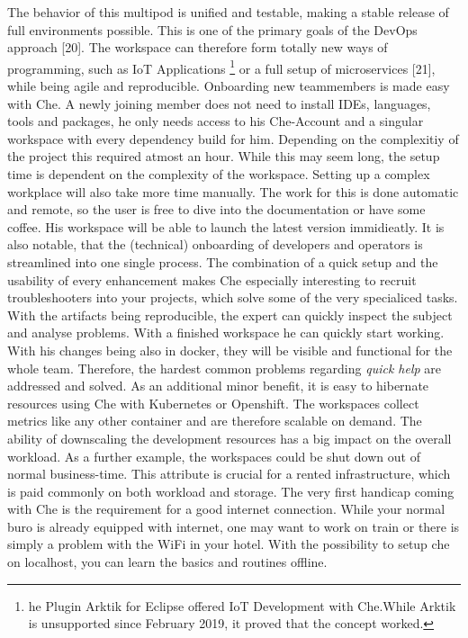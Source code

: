\documentclass[utf8,biblatex]{lni}
\begin{document}
The behavior of this multipod is unified and testable, making a stable release of full environments possible. 
This is one of the primary goals of the DevOps approach [20]. 
The workspace can therefore form totally new ways of programming, such as IoT Applications \footnote{he Plugin Arktik for Eclipse offered IoT Development with Che.While Arktik is unsupported since February 2019, it proved that the concept worked.} or a full setup of microservices [21], while being agile and reproducible.
Onboarding new teammembers is made easy with Che. 
A newly joining member does not need to install IDEs, languages, tools and packages, he only needs access to his Che-Account and a singular workspace with every dependency build for him.
Depending on the complexitiy of the project this required atmost an hour. 
While this may seem long, the setup time is dependent on the complexity of the workspace. 
Setting up a complex workplace will also take more time manually. 
The work for this is done automatic and remote, so the user is free to dive into the documentation or have some coffee. 
His workspace will be able to launch the latest version immidieatly.
It is also notable, that the (technical) onboarding of developers and operators is streamlined into one single process. 
The combination of a quick setup and the usability of every enhancement makes Che especially interesting to recruit troubleshooters into your projects, which solve some of the very specialiced tasks.  
With  the  artifacts  being  reproducible,  the  expert  can quickly inspect the subject and analyse problems.
With a finished workspace he can quickly start working. 
With his changes being also in docker, they will be visible and functional for the whole team.
Therefore,  the  hardest  common  problems  regarding \textit{quick help} are addressed and solved. 
As an additional minor benefit, it is easy to hibernate resources  using  Che  with  Kubernetes  or  Openshift.
The workspaces collect metrics like any other container and are therefore scalable on demand. 
The ability of downscaling the development resources has a big impact on the overall 
workload. 
As a further example, the workspaces could be shut down out of normal business-time. This attribute is crucial for a rented infrastructure, which is paid commonly on both workload and storage.  
The very first handicap coming with Che is the requirement for a good internet connection. 
While your normal buro is already equipped with internet, one may want to work on train or there is simply a problem with the WiFi in your hotel.
With the possibility to setup che on localhost, you can learn the basics and routines offline. 
\end{document}
